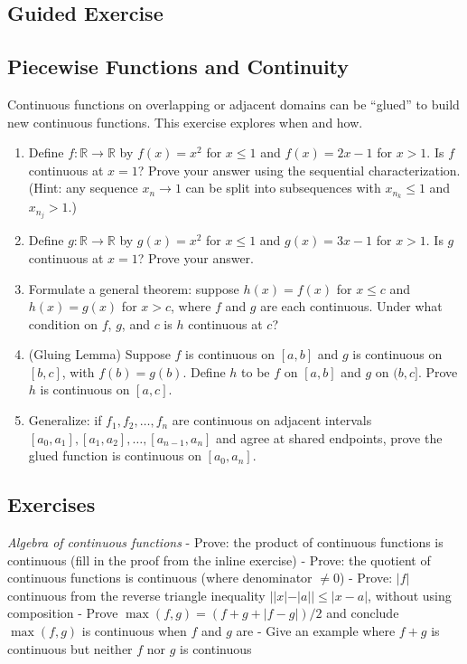 \documentclass[
  10pt,
  letterpaper,
]{scrbook}
\newcommand{\RR}{\mathbb{R}}
\begin{document}
\subsection{Guided Exercise}\label{guided-exercise-11}

\subsection{Piecewise Functions and
Continuity}\label{piecewise-functions-and-continuity}

Continuous functions on overlapping or adjacent domains can be ``glued''
to build new continuous functions. This exercise explores when and how.

\begin{enumerate}
\def\labelenumi{(\alph{enumi})}
\item
  Define \(f: \RR \to \RR\) by \(f(x) = x^2\) for \(x \leq 1\) and
  \(f(x) = 2x - 1\) for \(x > 1\). Is \(f\) continuous at \(x = 1\)?
  Prove your answer using the sequential characterization. (Hint: any
  sequence \(x_n \to 1\) can be split into subsequences with
  \(x_{n_k} \leq 1\) and \(x_{n_j} > 1\).)
\item
  Define \(g: \RR \to \RR\) by \(g(x) = x^2\) for \(x \leq 1\) and
  \(g(x) = 3x - 1\) for \(x > 1\). Is \(g\) continuous at \(x = 1\)?
  Prove your answer.
\item
  Formulate a general theorem: suppose \(h(x) = f(x)\) for \(x \leq c\)
  and \(h(x) = g(x)\) for \(x > c\), where \(f\) and \(g\) are each
  continuous. Under what condition on \(f\), \(g\), and \(c\) is \(h\)
  continuous at \(c\)?
\item
  (Gluing Lemma) Suppose \(f\) is continuous on \([a, b]\) and \(g\) is
  continuous on \([b, c]\), with \(f(b) = g(b)\). Define \(h\) to be
  \(f\) on \([a, b]\) and \(g\) on \((b, c]\). Prove \(h\) is continuous
  on \([a, c]\).
\item
  Generalize: if \(f_1, f_2, \ldots, f_n\) are continuous on adjacent
  intervals \([a_0, a_1], [a_1, a_2], \ldots, [a_{n-1}, a_n]\) and agree
  at shared endpoints, prove the glued function is continuous on
  \([a_0, a_n]\).
\end{enumerate}

\subsection{Exercises}\label{exercises-25}

\emph{Algebra of continuous functions} - Prove: the product of
continuous functions is continuous (fill in the proof from the inline
exercise) - Prove: the quotient of continuous functions is continuous
(where denominator \(\neq 0\)) - Prove: \(|f|\) continuous from the
reverse triangle inequality \(||x| - |a|| \leq |x - a|\), without using
composition - Prove \(\max(f, g) = (f + g + |f - g|)/2\) and conclude
\(\max(f,g)\) is continuous when \(f\) and \(g\) are - Give an example
where \(f + g\) is continuous but neither \(f\) nor \(g\) is continuous
\end{document}
